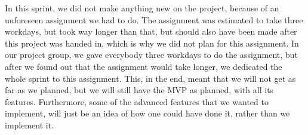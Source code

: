 In this sprint, we did not make anything new on the project, because of an unforeseen assignment we had to do.
The assignment was estimated to take three workdays, but took way longer than that, but should also have been made after this project was handed in, which is why we did not plan for this assignment.
In our project group, we gave everybody three workdays to do the assignment, but after we found out that the assignment would take longer, we dedicated the whole sprint to this assignment.
This, in the end, meant that we will not get as far as we planned, but we will still have the MVP as planned, with all its features.
Furthermore, some of the advanced features that we wanted to implement, will just be an idea of how one could have done it, rather than we implement it.